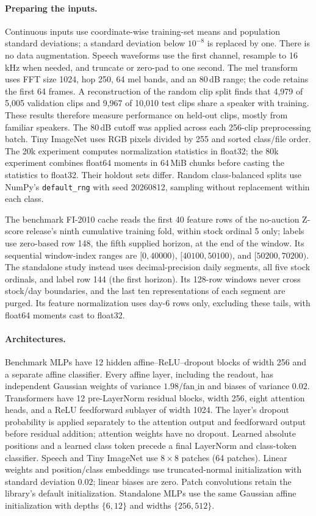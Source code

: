 \paragraph{Preparing the inputs.}
Continuous inputs use coordinate-wise training-set means and population standard deviations; a standard deviation below $10^{-8}$ is replaced by one. There is no data augmentation. Speech waveforms use the first channel, resample to 16\,kHz when needed, and truncate or zero-pad to one second. The mel transform uses FFT size 1024, hop 250, 64 mel bands, and an 80\,dB range; the code retains the first 64 frames. A reconstruction of the random clip split finds that 4,979 of 5,005 validation clips and 9,967 of 10,010 test clips share a speaker with training. These results therefore measure performance on held-out clips, mostly from familiar speakers. The 80\,dB cutoff was applied across each 256-clip preprocessing batch. Tiny ImageNet uses RGB pixels divided by 255 and sorted class/file order. The 20k experiment computes normalization statistics in float32; the 80k experiment combines float64 moments in 64\,MiB chunks before casting the statistics to float32. Their holdout sets differ. Random class-balanced splits use NumPy's \texttt{default\_rng} with seed 20260812, sampling without replacement within each class.

The benchmark FI-2010 cache reads the first 40 feature rows of the no-auction Z-score release's ninth cumulative training fold, within stock ordinal 5 only; labels use zero-based row 148, the fifth supplied horizon, at the end of the window. Its sequential window-index ranges are $[0,40000)$, $[40100,50100)$, and $[50200,70200)$. The standalone study instead uses decimal-precision daily segments, all five stock ordinals, and label row 144 (the first horizon). Its 128-row windows never cross stock/day boundaries, and the last ten representations of each segment are purged. Its feature normalization uses day-6 rows only, excluding these tails, with float64 moments cast to float32.

\paragraph{Architectures.}
Benchmark MLPs have 12 hidden affine--ReLU--dropout blocks of width 256 and a separate affine classifier. Every affine layer, including the readout, has independent Gaussian weights of variance $1.98/\mathrm{fan\_in}$ and biases of variance $0.02$. Transformers have 12 pre-LayerNorm residual blocks, width 256, eight attention heads, and a ReLU feedforward sublayer of width 1024. The layer's dropout probability is applied separately to the attention output and feedforward output before residual addition; attention weights have no dropout. Learned absolute positions and a learned class token precede a final LayerNorm and class-token classifier. Speech and Tiny ImageNet use $8\!\times\!8$ patches (64 patches). Linear weights and position/class embeddings use truncated-normal initialization with standard deviation $0.02$; linear biases are zero. Patch convolutions retain the library's default initialization. Standalone MLPs use the same Gaussian affine initialization with depths $\{6,12\}$ and widths $\{256,512\}$.

